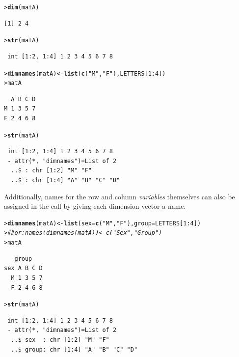 \documentclass[10pt,krantz2]{krantz}\usepackage[]{graphicx}\usepackage[]{color}
\makeatletter
\newcommand{\hlnum}[1]{\textcolor[rgb]{0.686,0.059,0.569}{#1}}%
\newcommand{\hlstr}[1]{\textcolor[rgb]{0.192,0.494,0.8}{#1}}%
\newcommand{\hlcom}[1]{\textcolor[rgb]{0.678,0.584,0.686}{\textit{#1}}}%
\newcommand{\hlopt}[1]{\textcolor[rgb]{0,0,0}{#1}}%
\newcommand{\hlstd}[1]{\textcolor[rgb]{0.345,0.345,0.345}{#1}}%
\newcommand{\hlkwb}[1]{\textcolor[rgb]{0.69,0.353,0.396}{#1}}%
\newcommand{\hlkwc}[1]{\textcolor[rgb]{0.333,0.667,0.333}{#1}}%
\newcommand{\hlkwd}[1]{\textcolor[rgb]{0.737,0.353,0.396}{\textbf{#1}}}%
\newenvironment{kframe}{%
 \def\at@end@of@kframe{}%
 \ifinner\ifhmode%
  \def\at@end@of@kframe{\end{minipage}}%
  \begin{minipage}{\columnwidth}%
 \fi\fi%
 \def\FrameCommand##1{\hskip\@totalleftmargin \hskip-\fboxsep
 \colorbox{shadecolor}{##1}\hskip-\fboxsep
     \hskip-\linewidth \hskip-\@totalleftmargin \hskip\columnwidth}%
 \MakeFramed {\advance\hsize-\width
   \@totalleftmargin\z@ \linewidth\hsize
   \@setminipage}}%
 {\par\unskip\endMakeFramed%
 \at@end@of@kframe}
\newenvironment{knitrout}{}{} %
\renewenvironment{knitrout}{\small\renewcommand{\baselinestretch}{.85}}{} %
\makeatother
\begin{document}
\begin{knitrout}
\color{fgcolor}\begin{kframe}
\begin{alltt}
\hlstd{> }\hlkwd{dim}\hlstd{(matA)}
\end{alltt}
\begin{verbatim}
[1] 2 4
\end{verbatim}
\begin{alltt}
\hlstd{> }\hlkwd{str}\hlstd{(matA)}
\end{alltt}
\begin{verbatim}
 int [1:2, 1:4] 1 2 3 4 5 6 7 8
\end{verbatim}
\begin{alltt}
\hlstd{> }\hlkwd{dimnames}\hlstd{(matA)} \hlkwb{<-} \hlkwd{list}\hlstd{(}\hlkwd{c}\hlstd{(}\hlstr{"M"}\hlstd{,} \hlstr{"F"}\hlstd{), LETTERS[}\hlnum{1}\hlopt{:}\hlnum{4}\hlstd{])}
\hlstd{> }\hlstd{matA}
\end{alltt}
\begin{verbatim}
  A B C D
M 1 3 5 7
F 2 4 6 8
\end{verbatim}
\begin{alltt}
\hlstd{> }\hlkwd{str}\hlstd{(matA)}
\end{alltt}
\begin{verbatim}
 int [1:2, 1:4] 1 2 3 4 5 6 7 8
 - attr(*, "dimnames")=List of 2
  ..$ : chr [1:2] "M" "F"
  ..$ : chr [1:4] "A" "B" "C" "D"
\end{verbatim}
\end{kframe}
\end{knitrout}
Additionally, names for the row and column \emph{variables} themselves can also be assigned in the
 call by giving each dimension vector a name.
\begin{knitrout}
\color{fgcolor}\begin{kframe}
\begin{alltt}
\hlstd{> }\hlkwd{dimnames}\hlstd{(matA)} \hlkwb{<-} \hlkwd{list}\hlstd{(}\hlkwc{sex} \hlstd{=} \hlkwd{c}\hlstd{(}\hlstr{"M"}\hlstd{,} \hlstr{"F"}\hlstd{),} \hlkwc{group} \hlstd{= LETTERS[}\hlnum{1}\hlopt{:}\hlnum{4}\hlstd{])}
\hlstd{> }\hlcom{## or: names(dimnames(matA)) <- c("Sex", "Group")}
\hlstd{> }\hlstd{matA}
\end{alltt}
\begin{verbatim}
   group
sex A B C D
  M 1 3 5 7
  F 2 4 6 8
\end{verbatim}
\begin{alltt}
\hlstd{> }\hlkwd{str}\hlstd{(matA)}
\end{alltt}
\begin{verbatim}
 int [1:2, 1:4] 1 2 3 4 5 6 7 8
 - attr(*, "dimnames")=List of 2
  ..$ sex  : chr [1:2] "M" "F"
  ..$ group: chr [1:4] "A" "B" "C" "D"
\end{verbatim}
\end{kframe}
\end{knitrout}
\end{document}
